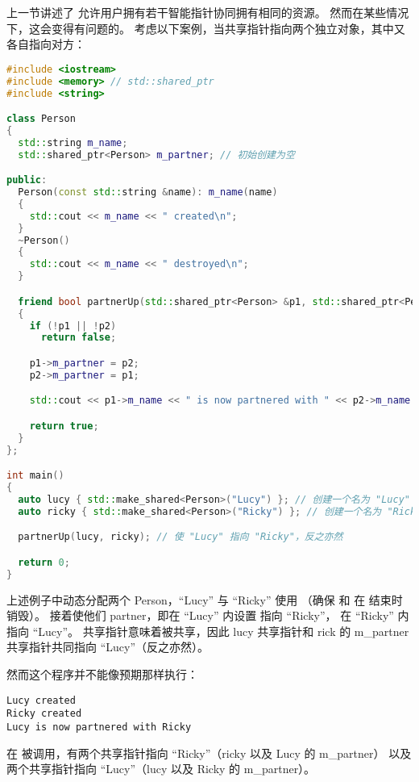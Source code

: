 \documentclass[../../LearnCpp.tex]{subfiles}
\begin{document}

上一节讲述了  允许用户拥有若干智能指针协同拥有相同的资源。
然而在某些情况下，这会变得有问题的。
考虑以下案例，当共享指针指向两个独立对象，其中又各自指向对方：

\begin{lstlisting}[language=C++]
#include <iostream>
#include <memory> // std::shared_ptr
#include <string>

class Person
{
  std::string m_name;
  std::shared_ptr<Person> m_partner; // 初始创建为空

public:
  Person(const std::string &name): m_name(name)
  {
    std::cout << m_name << " created\n";
  }
  ~Person()
  {
    std::cout << m_name << " destroyed\n";
  }

  friend bool partnerUp(std::shared_ptr<Person> &p1, std::shared_ptr<Person> &p2)
  {
    if (!p1 || !p2)
      return false;

    p1->m_partner = p2;
    p2->m_partner = p1;

    std::cout << p1->m_name << " is now partnered with " << p2->m_name << '\n';

    return true;
  }
};

int main()
{
  auto lucy { std::make_shared<Person>("Lucy") }; // 创建一个名为 "Lucy" 的 Person
  auto ricky { std::make_shared<Person>("Ricky") }; // 创建一个名为 "Ricky" 的 Person

  partnerUp(lucy, ricky); // 使 "Lucy" 指向 "Ricky"，反之亦然

  return 0;
}
\end{lstlisting}

上述例子中动态分配两个 Person，“Lucy” 与 “Ricky” 使用 
（确保  和  在  结束时销毁）。
接着使他们 partner，即在 “Lucy” 内设置  指向 “Ricky”，
在 “Ricky” 内指向 “Lucy”。
共享指针意味着被共享，因此 lucy 共享指针和 rick 的 m\_partner 共享指针共同指向 “Lucy”（反之亦然）。

然而这个程序并不能像预期那样执行：

\begin{lstlisting}
Lucy created
Ricky created
Lucy is now partnered with Ricky
\end{lstlisting}

在  被调用，有两个共享指针指向 “Ricky”（ricky 以及 Lucy 的 m\_partner）
以及两个共享指针指向 “Lucy”（lucy 以及 Ricky 的 m\_partner）。
\end{document}

